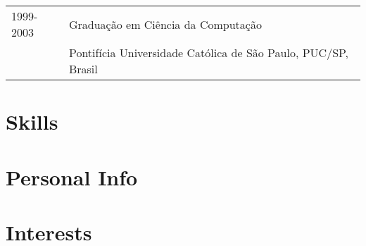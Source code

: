 \documentclass[a4paper, oneside, final]{scrartcl}
\begin{document}
\begin{center}
\begin{tabularx}{0.97\linewidth}{p{2cm}X}
1999-2003	& Graduação em Ciência da Computação\\
            & Pontifícia Universidade Católica de São Paulo, PUC/SP, Brasil
\end{tabularx}

\section{Skills}
\section{Personal Info}
\section{Interests}

\end{center}
\end{document}
